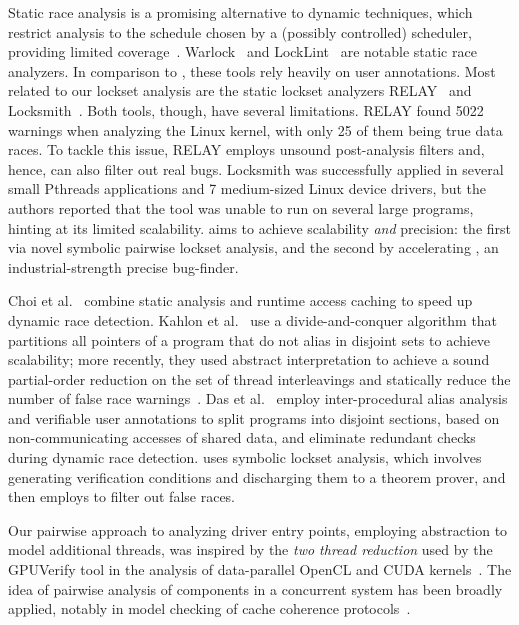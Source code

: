 Static race analysis is a promising alternative to dynamic techniques, which restrict analysis to the schedule chosen by a (possibly controlled) scheduler, providing limited coverage~\cite{musuvathi2008finding}. Warlock~\cite{sterling1993warlock} and LockLint~\cite{oracle2010locklint} are notable static race analyzers.  In comparison to \whoop, these tools rely heavily on user annotations.
%
Most related to our lockset analysis are the static lockset analyzers RELAY~\cite{voung2007relay} and Locksmith~\cite{pratikakis2006locksmith}. Both tools, though, have several limitations. RELAY found 5022 warnings when analyzing the Linux kernel, with only 25 of them being true data races. To tackle this issue, RELAY employs unsound post-analysis filters and, hence, can also filter out real bugs. Locksmith was successfully applied in several small Pthreads applications and 7 medium-sized Linux device drivers, but the authors reported that the tool was unable to run on several large programs, hinting at its limited scalability. \whoop aims to achieve scalability \emph{and} precision: the first via novel symbolic pairwise lockset analysis, and the second by accelerating \corral, an industrial-strength precise bug-finder.

Choi et al.~\cite{choi2002efficient} combine static analysis and runtime access caching to speed up dynamic race detection. Kahlon et al.~\cite{kahlon2007fast} use a divide-and-conquer algorithm that partitions all pointers of a program that do not alias in disjoint sets to achieve scalability; more recently, they used abstract interpretation to achieve a sound partial-order reduction on the set of thread interleavings and statically reduce the number of false race warnings~\cite{kahlon2009semantic}. Das et al.~\cite{das2015section} employ inter-procedural alias analysis and verifiable user annotations to split programs into disjoint sections, based on non-communicating accesses of shared data, and eliminate redundant checks during dynamic race detection. \whoop uses symbolic lockset analysis, which involves generating verification conditions and discharging them to a theorem prover, and then employs \corral to filter out false races. 

Our pairwise approach to analyzing driver entry points, employing abstraction to model additional threads, was inspired by the \emph{two thread reduction} used by the GPUVerify tool in the analysis of data-parallel OpenCL and CUDA kernels~\cite{gpuverify,bardsley2014engineering}.  The idea of pairwise analysis of components in a concurrent system has been broadly applied, notably in model checking of cache coherence protocols~\cite{mcmillan1999verification}.
